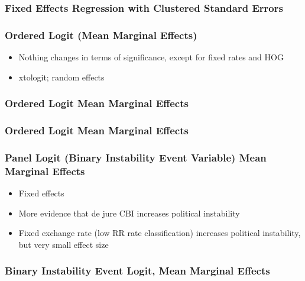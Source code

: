 \documentclass{beamer}
\begin{document}
    \begin{frame}
        \frametitle{Fixed Effects Regression with Clustered Standard Errors}
        {
            \let\oldcentering\centering
            \renewcommand\centering{\tiny\oldcentering}
            
        }
    \end{frame}

    \begin{frame}
        \frametitle{Ordered Logit (Mean Marginal Effects)}
        \begin{itemize}
            \item Nothing changes in terms of significance, except for fixed rates and HOG
            \item xtologit; random effects
        \end{itemize}
    \end{frame}

    \begin{frame}
        \frametitle{Ordered Logit Mean Marginal Effects}
        {
            \let\oldcentering\centering
            \renewcommand\centering{\tiny\oldcentering}
            
        }
    \end{frame}

    \begin{frame}
        \frametitle{Ordered Logit Mean Marginal Effects}
        {
            \let\oldcentering\centering
            \renewcommand\centering{\tiny\oldcentering}
            
        }
    \end{frame}

    \begin{frame}
        \frametitle{Panel Logit (Binary Instability Event Variable) Mean Marginal Effects}
        \begin{itemize}
            \item Fixed effects
            \item More evidence that de jure CBI increases political instability
            \item Fixed exchange rate (low RR rate classification) increases political instability, but very small effect size
        \end{itemize}
    \end{frame}

    \begin{frame}
        \frametitle{Binary Instability Event Logit, Mean Marginal Effects}
        {
            \let\oldcentering\centering
            \renewcommand\centering{\tiny\oldcentering}
            
        }
    \end{frame}
\end{document}
